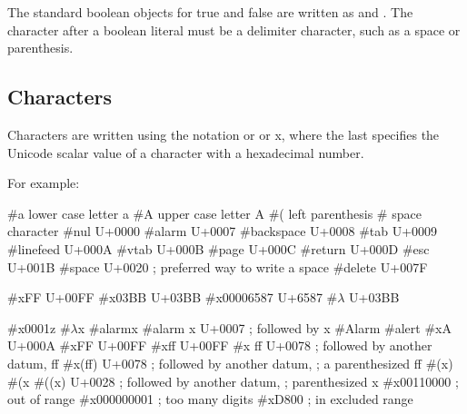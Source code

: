The standard boolean objects for true and false are written as
\schtrue{} and \schfalse.  The character
after a boolean literal must be a delimiter character, such as a
space or parenthesis.

\subsection{Characters}

Characters are written using the notation
\sharpsign\backwhack{} or
\sharpsign\backwhack{} or
\sharpsign\backwhack{}x, where the last
specifies the Unicode scalar value of a character with a hexadecimal number.

For example:

\begin{schemenoindent}
\#\backwhack{}a          \ev \textrm{lower case letter a}
\#\backwhack{}A          \ev \textrm{upper case letter A}
\#\backwhack{}(          \ev \textrm{left parenthesis}
\#\backwhack{}           \ev \textrm{space character}
\#\backwhack{}nul        \ev \textrm{U+0000}
\#\backwhack{}alarm      \ev \textrm{U+0007}
\#\backwhack{}backspace  \ev \textrm{U+0008}
\#\backwhack{}tab        \ev \textrm{U+0009}
\#\backwhack{}linefeed   \ev \textrm{U+000A}
\#\backwhack{}vtab       \ev \textrm{U+000B}
\#\backwhack{}page       \ev \textrm{U+000C}
\#\backwhack{}return     \ev \textrm{U+000D}
\#\backwhack{}esc        \ev \textrm{U+001B}
\#\backwhack{}space      \ev \textrm{U+0020}
\>\>; \textrm{preferred way to write a space}
\#\backwhack{}delete     \ev \textrm{U+007F}

\#\backwhack{}xFF        \ev \textrm{U+00FF}
\#\backwhack{}x03BB      \ev \textrm{U+03BB}
\#\backwhack{}x00006587  \ev \textrm{U+6587}
\#\backwhack{}\(\lambda\) \ev \textrm{U+03BB}

\#\backwhack{}x0001z     \ev {}
\#\backwhack{}\(\lambda\)x         \ev {}
\#\backwhack{}alarmx     \ev {}
\#\backwhack{}alarm x    \ev \textrm{U+0007}
\>\>; \textrm{followed by {\cf{}x}}
\#\backwhack{}Alarm      \ev {}
\#\backwhack{}alert      \ev {}
\#\backwhack{}xA         \ev \textrm{U+000A}
\#\backwhack{}xFF        \ev \textrm{U+00FF}
\#\backwhack{}xff        \ev \textrm{U+00FF}
\#\backwhack{}x ff       \ev \textrm{U+0078}
\>\>; \textrm{followed by another datum, {\cf{}ff}}
\#\backwhack{}x(ff)      \ev \textrm{U+0078}
\>\>; \textrm{followed by another datum,}
\>\>; \textrm{a parenthesized {\cf{}ff}}
\#\backwhack{}(x)        \ev {}
\#\backwhack{}(x         \ev {}
\#\backwhack{}((x)       \ev \textrm{U+0028}
\>\>; \textrm{followed by another datum,}
\>\>; \textrm{parenthesized {\cf{}x}}
\#\backwhack{}x00110000  \ev {}
\>\>; \textrm{out of range}
\#\backwhack{}x000000001 \ev {}
\>\>; \textrm{too many digits}  
\#\backwhack{}xD800      \ev {}
\>\>; \textrm{in excluded range}
\end{schemenoindent}

